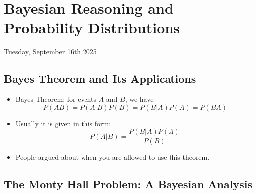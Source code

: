 \section{Bayesian Reasoning and Probability Distributions}

Tuesday, September 16th 2025

\subsection{Bayes Theorem and Its Applications}

\begin{itemize}
    \item Bayes Theorem: for events $A$ and $B$, we have
          \[ \boxed{P(AB) = P(A|B) P(B) = P(B|A) P(A) = P(BA)} \]

    \item Usually it is given in this form:
          \[ P(A|B) = \frac{P(B|A) P(A)}{P(B)} \]

    \item People argued about when you are allowed to use this theorem.
\end{itemize}

\subsection{The Monty Hall Problem: A Bayesian Analysis}

